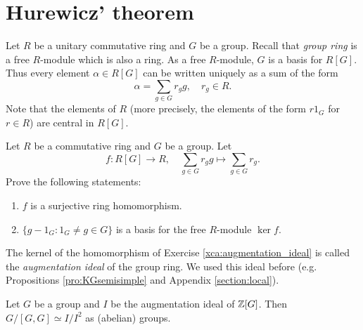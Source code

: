 \section{Hurewicz' theorem}

Let $R$ be a unitary commutative ring and $G$ be a group. Recall that \emph{group ring} is a free $R$-module which is also a ring. As a free $R$-module, $G$ is a basis for $R[G]$. Thus every element $\alpha\in R[G]$ can be written uniquely as 
a sum of the form 
\[
\alpha=\sum_{g\in G}r_gg,\quad r_g\in R.
\]
Note that the elements of $R$ (more precisely, the elements of the form $r1_G$ for $r\in R$) are central in $R[G]$. 

\begin{exercise}
\label{xca:augmentation_ideal}
    Let $R$ be a commutative ring and $G$ be a group. Let 
    \[
    f\colon R[G] \to R,\quad 
    \sum_{g \in G} r_g g\mapsto \sum_{g \in G} r_g.
    \]
    Prove the following statements:
    \begin{enumerate}
        \item $f$ is a surjective ring
            homomorphism. 
        \item $\{g - 1_G: 1_G\ne g \in G\}$ is a    basis for the free $R$-module $\ker f$.
    \end{enumerate}
\end{exercise}

The kernel of the homomorphism of Exercise \ref{xca:augmentation_ideal} is 
called the \emph{augmentation ideal} of
the group ring. We used this ideal before (e.g. Propositions \ref{pro:KGsemisimple} and Appendix \ref{section:local}). 

\begin{theorem}[Hurewicz]
    \label{thm:Hurewicz}
    Let $G$ be a group and $I$ be the augmentation ideal of $\mathbb{Z}[G]$. 
    Then $G/[G,G]\simeq I/I^2$ as (abelian) groups. 
\end{theorem}

